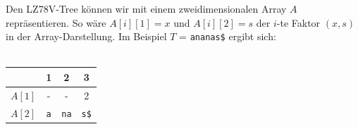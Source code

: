 \documentclass[a4paper,11pt]{scrartcl}%
\theoremstyle{change}
\theoremstyle{nonumberplain}
\theoremstyle{change}
\theoremstyle{nonumberplain}
\theoremstyle{change}
\theoremstyle{nonumberplain}
\begin{document}
	Den LZ78V-Tree können wir mit einem zweidimensionalen Array $A$ repräsentieren. So wäre $A[i][1] = x$ und $A[i][2] = s$ der $i$-te Faktor $(x,s)$ in der Array-Darstellung. Im Beispiel $T$ = \texttt{ananas\$} ergibt sich:\\\\
	\begin{tabular}{l c c c}
						\hline
							& 1 & 2 & 3 \\\hline
						$A[1]$ & - & - & 2 \\\hline
						$A[2]$	& \texttt{a} & \texttt{na} & \texttt{s\$}\\\hline
						
			
	\end{tabular}
	


 

	
\newpage

	
\end{document}
